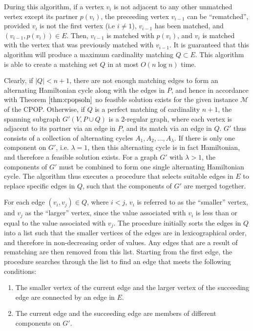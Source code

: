 \documentclass[oribibl]{llncs}
\begin{document}
During this algorithm, if a vertex $v_i$ is not adjacent to any other unmatched vertex except its partner $p(v_i)$, the preceeding vertex $v_{i-1}$ can be ``rematched'', provided $v_i$ is not the first vertex (i.e $i \neq 1$), $v_{i-1}$ has been matched, and $(v_{i-1}, p(v_i)) \in E$. Then, $v_{i-1}$ is matched with $p(v_i)$, and $v_i$ is matched with the vertex that was previously matched with $v_{i-1}$. It is guaranteed that this algorithm will produce a maximum cardinality matching $Q \subset E$. This algorithm is able to create a matching set $Q$ in at most $O(n \log n)$ time.

Clearly, if $|Q| < n+1$, there are not enough matching edges to form an alternating Hamiltonian cycle along with the edges in $P$, and hence in accordance with Theorem $\ref{thm:cpopsoln}$ no feasible solution exists for the given instance $\mathcal{M}$ of the CPOP. Otherwise, if $Q$ is a perfect matching of cardinality $n+1$, the spanning subgraph $G'(V, P \cup Q)$ is a 2-regular graph, where each vertex is adjacent to its partner via an edge in $P$, and its match via an edge in $Q$. $G'$ thus consists of a collection of alternating cycles $A_1, A_2, ..., A_{\lambda}$. If there is only one component on $G'$, i.e. $\lambda = 1$, then this alternating cycle is in fact Hamiltonian, and therefore a feasible solution exists. For a graph $G'$ with $\lambda > 1$, the components of $G'$ must be combined to form one single alternating Hamiltonian cycle. The algorithm thus executes a procedure that selects suitable edges in $E$ to replace specific edges in $Q$, such that the components of $G'$ are merged together.

For each edge $(v_i, v_j) \in Q$, where $i < j$, $v_i$ is referred to as the ``smaller'' vertex, and $v_j$ as the ``larger'' vertex, since the value associated with $v_i$ is less than or equal to the value associated with $v_j$. The procedure initially sorts the edges in $Q$ into a list such that the smaller vertices of the edges are in lexicographical order, and therefore in non-decreasing order of values. Any edges that are a result of rematching are then removed from this list. Starting from the first edge, the procedure searches through the list to find an edge that meets the following conditions:
\begin{enumerate}
	\item The smaller vertex of the current edge and the larger vertex of the succeeding edge are connected by an edge in $E$.
	\item The current edge and the succeeding edge are members of different components on $G'$.
\end{enumerate}
\end{document}
